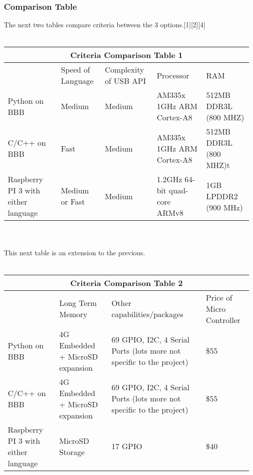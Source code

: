 \documentclass[10pt,draftclsnofoot,onecolumn]{IEEEtran}
\begin{document}
\subsubsection{Comparison Table} 
   The next two tables compare criteria between the 3 options.[1][2][4]\\ \\
\begin{tabular}{ |p{2cm}|p{2cm}|p{2cm}| p{2cm}|p{2cm}| }
\hline
\multicolumn{5}{|c|}{Criteria Comparison Table 1} \\
\hline
    &Speed of Language&Complexity of USB API&Processor&RAM\\
\hline
Python on BBB&Medium &Medium&AM335x 1GHz ARM Cortex-A8&512MB DDR3L (800 MHZ) \\
\hline
C/C++ on BBB &Fast& Medium&AM335x 1GHz ARM Cortex-A8&512MB DDR3L (800 MHZ)t \\
\hline
Raspberry PI 3 with either language &Medium or Fast&Medium&1.2GHz 64-bit quad-core ARMv8&1GB LPDDR2 (900 MHz) \\
\hline
\end{tabular}
\\ \\ This next table is an extension to the previous. \\ \\
\begin{tabular}{ |p{2cm}|p{2cm}|p{2cm}| p{2cm}| }
\hline
\multicolumn{4}{|c|}{Criteria Comparison Table 2} \\
\hline
   &Long Term Memory&Other capabilities/packages&Price of Micro Controller\\
\hline
Python on BBB &4G Embedded + MicroSD expansion&69 GPIO, I2C, 4 Serial Ports (lots more not specific to the project)&\$55 \\
\hline
C/C++ on BBB &4G Embedded + MicroSD expansion&69 GPIO, I2C, 4 Serial Ports (lots more not specific to the project)&\$55 \\
\hline
Raspberry PI 3 with either language &MicroSD Storage &17 GPIO &\$40 \\
\hline
\end{tabular}
\vspace{1cm}
\end{document}
